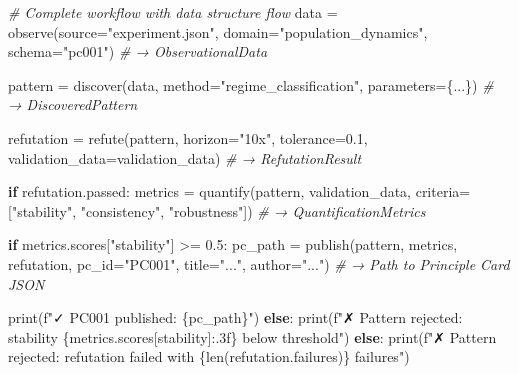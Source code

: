 \documentclass[
]{article}
\newenvironment{Shaded}{}{}
\newcommand{\BuiltInTok}[1]{\textcolor[rgb]{0.00,0.50,0.00}{#1}}
\newcommand{\CommentTok}[1]{\textcolor[rgb]{0.38,0.63,0.69}{\textit{#1}}}
\newcommand{\ControlFlowTok}[1]{\textcolor[rgb]{0.00,0.44,0.13}{\textbf{#1}}}
\newcommand{\FloatTok}[1]{\textcolor[rgb]{0.25,0.63,0.44}{#1}}
\newcommand{\NormalTok}[1]{#1}
\newcommand{\OperatorTok}[1]{\textcolor[rgb]{0.40,0.40,0.40}{#1}}
\newcommand{\SpecialCharTok}[1]{\textcolor[rgb]{0.25,0.44,0.63}{#1}}
\newcommand{\SpecialStringTok}[1]{\textcolor[rgb]{0.73,0.40,0.53}{#1}}
\newcommand{\StringTok}[1]{\textcolor[rgb]{0.25,0.44,0.63}{#1}}
\begin{document}
\begin{Shaded}
\begin{Highlighting}[]
\CommentTok{\# Complete workflow with data structure flow}
\NormalTok{data }\OperatorTok{=}\NormalTok{ observe(source}\OperatorTok{=}\StringTok{"experiment.json"}\NormalTok{, domain}\OperatorTok{=}\StringTok{"population\_dynamics"}\NormalTok{, schema}\OperatorTok{=}\StringTok{"pc001"}\NormalTok{)}
\CommentTok{\# → ObservationalData}

\NormalTok{pattern }\OperatorTok{=}\NormalTok{ discover(data, method}\OperatorTok{=}\StringTok{"regime\_classification"}\NormalTok{, parameters}\OperatorTok{=}\NormalTok{\{...\})}
\CommentTok{\# → DiscoveredPattern}

\NormalTok{refutation }\OperatorTok{=}\NormalTok{ refute(pattern, horizon}\OperatorTok{=}\StringTok{"10x"}\NormalTok{, tolerance}\OperatorTok{=}\FloatTok{0.1}\NormalTok{, validation\_data}\OperatorTok{=}\NormalTok{validation\_data)}
\CommentTok{\# → RefutationResult}

\ControlFlowTok{if}\NormalTok{ refutation.passed:}
\NormalTok{    metrics }\OperatorTok{=}\NormalTok{ quantify(pattern, validation\_data, criteria}\OperatorTok{=}\NormalTok{[}\StringTok{"stability"}\NormalTok{, }\StringTok{"consistency"}\NormalTok{, }\StringTok{"robustness"}\NormalTok{])}
    \CommentTok{\# → QuantificationMetrics}

    \ControlFlowTok{if}\NormalTok{ metrics.scores[}\StringTok{"stability"}\NormalTok{] }\OperatorTok{\textgreater{}=} \FloatTok{0.5}\NormalTok{:}
\NormalTok{        pc\_path }\OperatorTok{=}\NormalTok{ publish(pattern, metrics, refutation, pc\_id}\OperatorTok{=}\StringTok{"PC001"}\NormalTok{, title}\OperatorTok{=}\StringTok{"..."}\NormalTok{, author}\OperatorTok{=}\StringTok{"..."}\NormalTok{)}
        \CommentTok{\# → Path to Principle Card JSON}

        \BuiltInTok{print}\NormalTok{(}\SpecialStringTok{f"✓ PC001 published: }\SpecialCharTok{\{}\NormalTok{pc\_path}\SpecialCharTok{\}}\SpecialStringTok{"}\NormalTok{)}
    \ControlFlowTok{else}\NormalTok{:}
        \BuiltInTok{print}\NormalTok{(}\SpecialStringTok{f"✗ Pattern rejected: stability }\SpecialCharTok{\{}\NormalTok{metrics}\SpecialCharTok{.}\NormalTok{scores[}\StringTok{\textquotesingle{}stability\textquotesingle{}}\NormalTok{]}\SpecialCharTok{:.3f\}}\SpecialStringTok{ below threshold"}\NormalTok{)}
\ControlFlowTok{else}\NormalTok{:}
    \BuiltInTok{print}\NormalTok{(}\SpecialStringTok{f"✗ Pattern rejected: refutation failed with }\SpecialCharTok{\{}\BuiltInTok{len}\NormalTok{(refutation.failures)}\SpecialCharTok{\}}\SpecialStringTok{ failures"}\NormalTok{)}
\end{Highlighting}
\end{Shaded}
\end{document}
